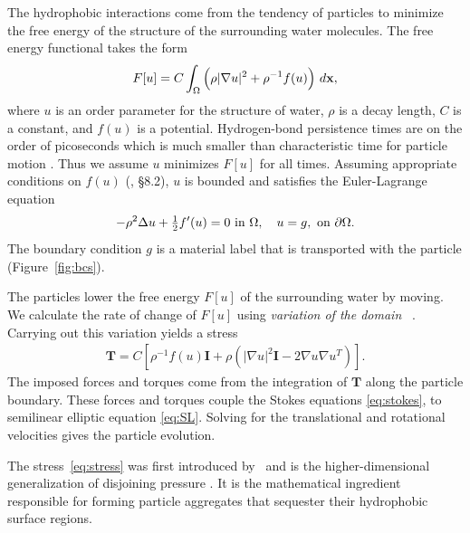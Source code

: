 The hydrophobic interactions come from the tendency of particles to
minimize the free energy of the structure of the surrounding water
molecules. The free energy functional takes the form 
\begin{equation}
\label{eq:free_energy}
  F[u] = C \int_{\Omega} \left(\rho |\nabla u|^2 + \rho^{-1} f(u)\right)
  \,d\mathbf{x},
\end{equation}
where $u$ is an order parameter for the structure of water, $\rho$ is a
decay length, $C$ is a constant, and $f(u)$ is a potential.
Hydrogen-bond persistence times are on the order of picoseconds
which is much smaller than characteristic time for 
particle motion \cite{MaGa13}.
Thus we assume $u$ minimizes $F[u]$ for all times.
Assuming appropriate conditions on $f(u)$ (\cite{evans10}, \S 8.2),
$u$ is bounded and satisfies the Euler-Lagrange equation
\begin{equation}
\label{eq:SL}
-\rho^2 \Delta u + \tfrac{1}{2}f'(u) = 0  \text{ in } \Omega,\quad u = g,
\text{ on } \partial\Omega.
\end{equation}
The boundary condition $g$ is a material label that is transported with
the particle (Figure~\ref{fig:bcs}).

The particles lower the free energy $F[u]$ of the surrounding water
by moving. We calculate the rate of change of $F[u]$ using
\emph{variation of the domain} ~\cite{Fu2018_SIAM,Bandle2015, Schiffer1954, Grinfeld2010}.
Carrying out
this variation yields a 
stress  
\begin{align}
  \label{eq:stress}
\mathbf{T}
= C \left[ \rho^{-1} f(u) \mathbf{I}
  + \rho \left(|\nabla u|^2 \mathbf{I} - 2\nabla u \nabla u^T\right)\right].
\end{align}
The imposed forces and torques come from the integration of $\mathbf{T}$
along the particle boundary.
These forces and torques couple the Stokes equations \eqref{eq:stokes},
to semilinear elliptic equation \eqref{eq:SL}.
Solving for the translational and rotational velocities gives the
particle evolution.

The stress~\eqref{eq:stress} was first
introduced by~\cite{Fu2018_SIAM} and is the higher-dimensional
generalization of disjoining pressure \cite{MaRa76, ErLjCl89, KoNa15,
Nagle17, KUZMIN2005}. It is the mathematical ingredient responsible for
forming particle aggregates that sequester their hydrophobic surface
regions.

